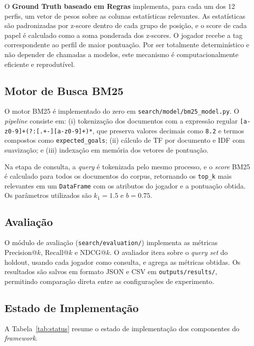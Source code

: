 \documentclass[portuguese]{sbc2025}
\begin{document}
O \textbf{Ground Truth baseado em Regras} implementa, para cada um dos 12 perfis, um
vetor de pesos sobre as colunas estatísticas relevantes. As estatísticas são
padronizadas por z-score dentro de cada grupo de posição, e o score de cada papel é
calculado como a soma ponderada dos z-scores. O jogador recebe a tag correspondente
ao perfil de maior pontuação. Por ser totalmente determinístico e não depender de
chamadas a modelos, este mecanismo é computacionalmente eficiente e reprodutível.

\subsection{Motor de Busca BM25}

O motor BM25 é implementado do zero em \texttt{search/model/bm25\_model.py}. O
\textit{pipeline} consiste em: (i) tokenização dos documentos com a expressão regular
\texttt{[a-z0-9]+(?:[.+-][a-z0-9]+)*}, que preserva valores decimais como \texttt{8.2}
e termos compostos como \texttt{expected\_goals}; (ii) cálculo de TF por documento e
IDF com suavização; e (iii) indexação em memória dos vetores de pontuação.

Na etapa de consulta, a \textit{query} é tokenizada pelo mesmo processo, e o
\textit{score} BM25 é calculado para todos os documentos do corpus, retornando os
\texttt{top\_k} mais relevantes em um \texttt{DataFrame} com os atributos do jogador
e a pontuação obtida. Os parâmetros utilizados são $k_1 = 1.5$ e $b = 0.75$.

\subsection{Avaliação}

O módulo de avaliação (\texttt{search/evaluation/}) implementa as métricas
Precision@$k$, Recall@$k$ e NDCG@$k$. O avaliador itera sobre o \textit{query set}
do holdout, usando cada jogador como consulta, e agrega as métricas obtidas. Os
resultados são salvos em formato JSON e CSV em \texttt{outputs/results/}, permitindo
comparação direta entre as configurações de experimento.

\subsection{Estado de Implementação}

A Tabela~\ref{tab:status} resume o estado de implementação dos componentes do
\textit{framework}.
\end{document}
